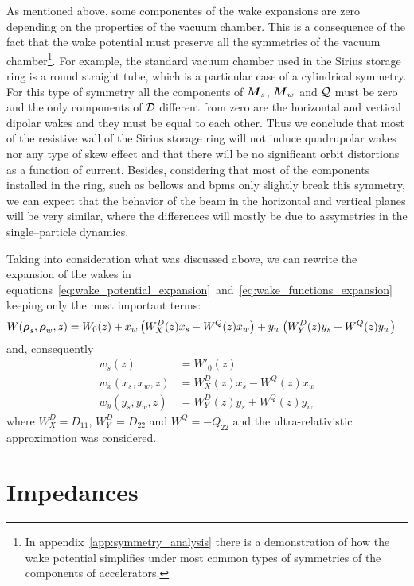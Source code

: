    As mentioned above, some componentes of the wake expansions are zero depending on the properties of the vacuum chamber. This is a consequence of the fact that the wake potential must preserve all the symmetries of the vacuum chamber\footnote{In appendix~\ref{app:symmetry_analysis} there is a demonstration of how the wake potential simplifies under most common types of symmetries of the components of accelerators.}. For example, the standard vacuum chamber used in the Sirius storage ring is a round straight tube, which is a particular case of a cylindrical symmetry. For this type of symmetry all the components of $\boldsymbol{M}_s$, $\boldsymbol{M}_w$ and $\mathcal{Q}$ must be zero and the only components of $\mathcal{D}$ different from zero are the horizontal and vertical dipolar wakes and they must be equal to each other. Thus we conclude that most of the resistive wall of the Sirius storage ring will not induce quadrupolar wakes nor any type of skew effect and that there will be no significant orbit distortions as a function of current. Besides, considering that most of the components installed in the ring, such as bellows and \glspl{bpm} only slightly break this symmetry, we can expect that the behavior of the beam in the horizontal and vertical planes will be very similar, where the differences will mostly be due to assymetries in the single--particle dynamics.

    Taking into consideration what was discussed above, we can rewrite the expansion of the wakes in equations~\eqref{eq:wake_potential_expansion}~and~\eqref{eq:wake_functions_expansion} keeping only the most important terms:
    \begin{align}\label{eq:important_wake_potential}
  	  	W(\boldsymbol{\rho}_s, \boldsymbol{\rho}_w, z) &=
	  		W_0(z) +
			x_w\left(W^D_X(z)x_s - W^Q(z)x_w\right) +
			y_w\left(W^D_Y(z)y_s + W^Q(z)y_w\right)
    \end{align}
    and, consequently
    \begin{align}\label{eq:important_wakes}\nonumber
  		w_s(z) &= W'_0(z) \\
		w_x(x_s, x_w, z) &= W^D_X(z)x_s - W^Q(z)x_w \\\nonumber
		w_y(y_s, y_w, z) &= W^D_Y(z)y_s + W^Q(z)y_w
    \end{align}
    where $W^D_X = D_{11}$, $W^D_Y = D_{22}$ and $W^Q = -Q_{22}$ and the ultra-relativistic approximation was considered.

\section{Impedances}\label{sec:impedances}


